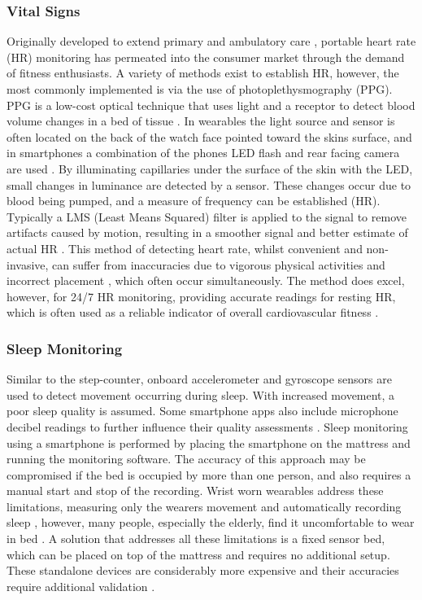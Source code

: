 \subsubsection{Vital Signs}
Originally developed to extend primary and ambulatory care \cite{HOLTER1949}, portable heart rate (HR) monitoring has permeated into the consumer market through the demand of fitness enthusiasts. A variety of methods exist to establish HR, however, the most commonly implemented is via the use of photoplethysmography (PPG). PPG is a low-cost optical technique that uses light and a receptor to detect blood volume changes in a bed of tissue \cite{Allen2007}. In wearables the light source and sensor is often located on the back of the watch face pointed toward the skins surface, and in smartphones a combination of the phones LED flash and rear facing camera are used \cite{Asada2003}. By illuminating capillaries under the surface of the skin with the LED, small changes in luminance are detected by a sensor. These changes occur due to blood being pumped, and a measure of frequency can be established (HR). Typically a LMS (Least Means Squared) filter is applied to the signal to remove artifacts caused by motion, resulting in a smoother signal and better estimate of actual HR \cite{Chan2002}. This method of detecting heart rate, whilst convenient and non-invasive, can suffer from inaccuracies due to vigorous physical activities and incorrect placement \cite{Parak2014}, which often occur simultaneously. The method does excel, however, for 24/7 HR monitoring, providing accurate readings for resting HR, which is often used as a reliable indicator of overall cardiovascular fitness \cite{Mukhopadhyay2015, Steinhubl2015}.

\subsubsection{Sleep Monitoring}
Similar to the step-counter, onboard accelerometer and gyroscope sensors are used to detect movement occurring during sleep. With increased movement, a poor sleep quality is assumed. Some smartphone apps also include microphone decibel readings to further influence their quality assessments \cite{Calikli2014}. Sleep monitoring using a smartphone is performed by placing the smartphone on the mattress and running the monitoring software. The accuracy of this approach may be compromised if the bed is occupied by more than one person, and also requires a manual start and stop of the recording. Wrist worn wearables address these limitations, measuring only the wearers movement and automatically recording sleep \cite{VanHees2015}, however, many people, especially the elderly, find it uncomfortable to wear in bed \cite{Fisher2015}. A solution that addresses all these limitations is a fixed sensor bed, which can be placed on top of the mattress and requires no additional setup. These standalone devices are considerably more expensive and their accuracies require additional validation \cite{Ko2015}.

